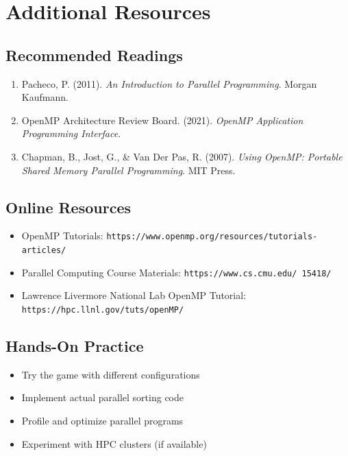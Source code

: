 \section{Additional Resources}
\label{app:d:additional-resources}

\subsection{Recommended Readings}

\begin{enumerate}
    \item Pacheco, P. (2011). \textit{An Introduction to Parallel Programming}. Morgan Kaufmann.
    \item OpenMP Architecture Review Board. (2021). \textit{OpenMP Application Programming Interface}.
    \item Chapman, B., Jost, G., \& Van Der Pas, R. (2007). \textit{Using OpenMP: Portable Shared Memory Parallel Programming}. MIT Press.
\end{enumerate}

\subsection{Online Resources}

\begin{itemize}
    \item OpenMP Tutorials: \texttt{https://www.openmp.org/resources/tutorials-articles/}
    \item Parallel Computing Course Materials: \texttt{https://www.cs.cmu.edu/~15418/}
    \item Lawrence Livermore National Lab OpenMP Tutorial: \texttt{https://hpc.llnl.gov/tuts/openMP/}
\end{itemize}

\subsection{Hands-On Practice}

\begin{itemize}
    \item Try the game with different configurations
    \item Implement actual parallel sorting code
    \item Profile and optimize parallel programs
    \item Experiment with HPC clusters (if available)
\end{itemize}

